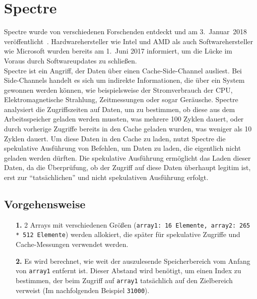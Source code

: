\section{Spectre}
\label{sec:spectre}
Spectre wurde von verschiedenen Forschenden entdeckt und am 3.~Januar~2018 veröffentlicht~\cite{kocher2018spectre}.
Hardwarehersteller wie Intel und AMD als auch Softwarehersteller wie Microsoft wurden bereits am 1.~Juni 2017 informiert, um die Lücke im Voraus durch Softwareupdates zu schließen. \\
Spectre ist ein Angriff, der Daten über einen Cache-Side-Channel ausliest.
Bei Side-Channels handelt es sich um indirekte Informationen, die über ein System gewonnen werden können, wie beispielsweise der Stromverbrauch der CPU, Elektromagnetische Strahlung, Zeitmessungen oder sogar Geräusche.
Spectre analysiert die Zugriffszeiten auf Daten, um zu bestimmen, ob diese aus dem Arbeitsspeicher geladen werden mussten, was mehrere 100 Zyklen dauert, oder durch vorherige Zugriffe bereits in den Cache geladen wurden, was weniger als 10 Zyklen dauert.
Um diese Daten in den Cache zu laden, nutzt Spectre die spekulative Ausführung von Befehlen, um Daten zu laden, die eigentlich nicht geladen werden dürften.
Die spekulative Ausführung ermöglicht das Laden dieser Daten, da die Überprüfung, ob der Zugriff auf diese Daten überhaupt legitim ist, erst zur \enquote{tatsächlichen} und nicht spekulativen Ausführung erfolgt.

\subsection{Vorgehensweise}
\label{subsec:spectre_vorgehensweise}
\begin{itemize}
	\item[\textbf{1.}] 2 Arrays mit verschiedenen Größen (\texttt{array1: 16 Elemente, array2: 265 * 512 Elemente}) werden allokiert, die später für spekulative Zugriffe und Cache-Messungen verwendet werden.
	\item[\textbf{2.}] Es wird berechnet, wie weit der auszulesende Speicherbereich vom Anfang von \texttt{array1} entfernt ist.
	      Dieser Abstand wird benötigt, um einen Index zu bestimmen, der beim Zugriff auf \texttt{array1} tatsächlich auf den Zielbereich verweist (Im nachfolgenden Beispiel \texttt{31000}).
\end{itemize}

